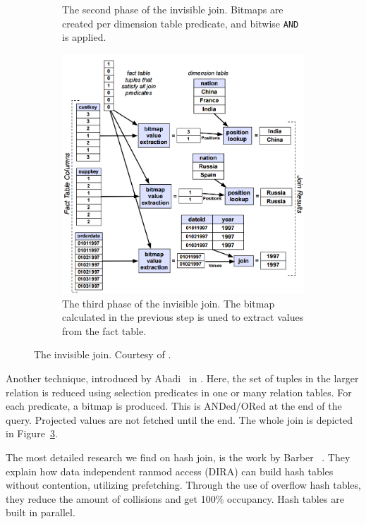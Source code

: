 \begin{figure}
\begin{subfigure}{0.45\textwidth}
    \caption{The second phase of the invisible join. Bitmaps are created per dimension table predicate, and bitwise \texttt{AND} is applied.}
    \label{fig:invisible-join-1} 
  \end{subfigure}
  \begin{subfigure}{0.45\textwidth}
    \includegraphics[width=\textwidth]{img/invisible-join-3.png}
    \caption{The third phase of the invisible join. The bitmap calculated in the previous step is uned to extract values from the fact table.}
    \label{fig:invisible-join-1} 
  \end{subfigure}
  \caption{The invisible join. Courtesy of \cite{Abadi2008-dd}.}
  \label{fig:invisible-join} 
\end{figure}
Another technique, introduced by Abadi \ea~in  \cite{Abadi2008-dd}. Here, the set of tuples in the larger relation is reduced using selection predicates in one or many relation tables. For each predicate, a bitmap is produced. This is ANDed/ORed at the end of the query. Projected values are not fetched until the end. The whole join is depicted in Figure~\ref{fig:invisible-join}.

The most detailed research we find on hash join, is the work by Barber \ea~\cite{Barber2014-ey}. They explain how data independent ranmod access (DIRA) can build hash tables without contention, utilizing prefetching. Through the use of overflow hash tables, they reduce the amount of collisions and get 100\% occupancy. Hash tables are built in parallel.


